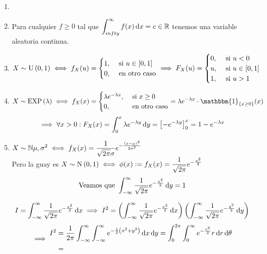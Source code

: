 \begin{ejem}
	\begin{enumerate}
		\item[]
		\item Para cualquier $f\geq 0$ tal que $\ds \int_{\-infty}^{\infty} f(x) \odif{x} = c \in \R$ tenemos una variable aleatoria continua.
		\item $\displaystyle X\sim\operatorname{U}\left(0,1\right) \iff f_X(u)=\begin{cases}
				      1, & \text{ si } u\in[0,1] \\
				      0, & \text{ en otro caso}
			      \end{cases} \implies F_X(u) = \begin{cases}
				      0, & \text{ si } u<0       \\
				      u, & \text{ si } u\in[0,1] \\
				      1, & \text{ si } u>1
			      \end{cases}$
		\item $\ds X\sim\EXP{\lambda} \iff f_X(x) = \begin{cases}
				      \lambda e^{-\lambda x}, & \text{ si } x\geq 0  \\
				      0,                      & \text{ en otro caso}
			      \end{cases} = \lambda e^{-\lambda x} \cdot \mathbbm{1}_{\{x\geq 0\}}(x)$
		      \[\implies \forall x > 0 : F_X(x) = \int_{0}^{x} \lambda e^{-\lambda y} \odif{y} = \left[-e^{-\lambda y}\right]_{0}^{x} = 1-e^{-\lambda x}\]
		\item $\displaystyle X\sim\mathbb{N}{\mu, \sigma^2} \iff f_X(x) = \frac{1}{\sqrt{2\pi}\sigma} e^{-\frac{(x-\mu)^2}{2\sigma^2}}$ \\
		      Pero la guay es $\displaystyle X\sim\operatorname{N}\left(0, 1\right) \iff \phi(x) \vcentcolon= f_X(x) = \frac{1}{\sqrt{2\pi}} e^{-\frac{x^2}{2}}$
		      \[\tex{Veamos que } \int_{-\infty}^{\infty} \frac{1}{\sqrt{2\pi}} e^{-\frac{x^2}{2}}\odif{y} = 1\]
		      \begin{dem}
			      \[I = \int_{-\infty}^{\infty} \frac{1}{\sqrt{2\pi}} e^{-\frac{x^2}{2}} \odif{x}\implies I^2 = \left(\int_{-\infty}^{\infty} \frac{1}{\sqrt{2\pi}} e^{-\frac{x^2}{2}}\odif{x}\right)\left(\int_{-\infty}^{\infty} \frac{1}{\sqrt{2\pi}} e^{-\frac{y^2}{2}} \odif{y}\right)\]
			      \[\implies \begin{aligned} I^2 & = \frac{1}{2\pi} \int_{-\infty}^{\infty} \int_{-\infty}^{\infty} e^{-\frac{1}{2}\left(x^2+y^2\right)} \odif{x} \odif{y} = \int_{0}^{2\pi} \int_{0}^{\infty} e^{-\frac{r^2}{2}} r \odif{r} \odif{\theta} \\
                    & =\end{aligned}\]
		      \end{dem}
	\end{enumerate}
\end{ejem}

